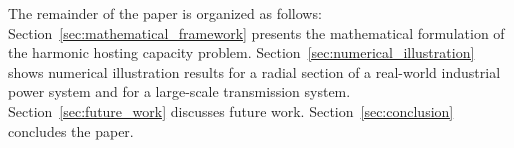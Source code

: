 The remainder of the paper is organized as follows: Section~\ref{sec:mathematical_framework} presents the mathematical formulation of the harmonic hosting capacity problem. Section~\ref{sec:numerical_illustration} shows numerical illustration results for a radial section of a real-world industrial power system and for a large-scale transmission system. Section~\ref{sec:future_work} discusses future work. Section~\ref{sec:conclusion} concludes the paper.